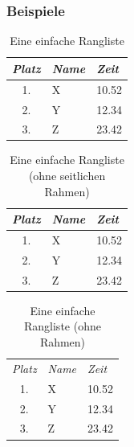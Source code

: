 \documentclass[paper=a4    %
,twoside=false             %
,fontsize=12pt             %
,DIV=11                    %
,parskip=half		   %
]{scrartcl}
\begin{document}
\subsubsection*{Beispiele}
\begin{table}[h]
	\begin{tabular}{| c | l | l |}
		\hline
		\textit{Platz} & \textit{Name} & \textit{Zeit} \\
		\hline
		1. & X & 10.52 \\
		2. & Y & 12.34 \\
		3. & Z & 23.42 \\
		\hline
		\end{tabular}
	\caption{Eine einfache Rangliste}
\end{table}
\begin{table}[h]
	\begin{tabular}{ c  l  l}
		\hline
		\textit{Platz} & \textit{Name} & \textit{Zeit} \\
		\hline
		1. & X & 10.52 \\
		2. & Y & 12.34 \\
		3. & Z & 23.42 \\
		\hline
		\end{tabular}
	\caption{Eine einfache Rangliste (ohne seitlichen Rahmen)}
\end{table}
\begin{table}[h]
	\begin{tabular}{ c  l  l }
		\textit{Platz} & \textit{Name} & \textit{Zeit} \\
		1. & X & 10.52 \\
		2. & Y & 12.34 \\
		3. & Z & 23.42 \\
		\end{tabular}
	\caption{Eine einfache Rangliste (ohne Rahmen)}
\end{table}
\end{document}
